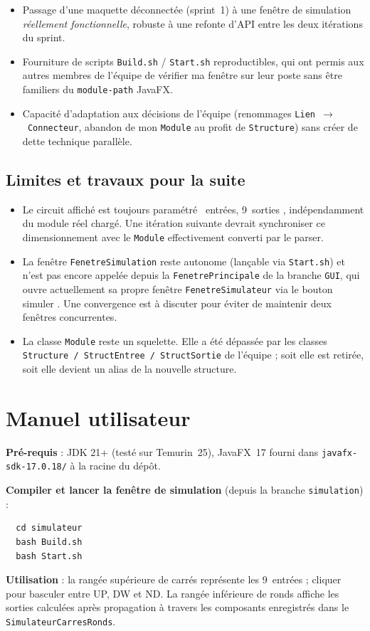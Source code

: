 \documentclass[11pt,a4paper]{article}
\begin{document}
\begin{itemize}
  \item Passage d'une maquette d\'econnect\'ee (sprint~1) \`a une fen\^etre de simulation \emph{r\'eelle\-ment fonctionnelle}, robuste \`a une refonte d'API entre les deux it\'erations du sprint.
  \item Fourniture de scripts \texttt{Build.sh} / \texttt{Start.sh} reproductibles, qui ont permis aux autres membres de l'\'equipe de v\'erifier ma fen\^etre sur leur poste sans \^etre familiers du \texttt{module-path} JavaFX.
  \item Capacit\'e d'adaptation aux d\'ecisions de l'\'equipe (renommages \texttt{Lien~$\to$~Connecteur}, abandon de mon \texttt{Module} au profit de \texttt{Structure}) sans cr\'eer de dette technique parall\`ele.
\end{itemize}

\subsection*{Limites et travaux pour la suite}

\begin{itemize}
  \item Le circuit affich\'e est toujours param\'etr\'e ~entr\'ees, 9~sorties \fg{}, ind\'ependamment du module r\'eel charg\'e. Une it\'eration suivante devrait synchroniser ce dimensionnement avec le \texttt{Module} effectivement converti par le parser.
  \item La fen\^etre \texttt{FenetreSimulation} reste autonome (lan\c{c}able via \texttt{Start.sh}) et n'est pas encore appel\'ee depuis la \texttt{FenetrePrincipale} de la branche \texttt{GUI}, qui ouvre actuellement sa propre fen\^etre \texttt{FenetreSimulateur} via le bouton \og simuler \fg{}. Une convergence est \`a discuter pour \'eviter de maintenir deux fen\^etres concurrentes.
  \item La classe \texttt{Module} reste un squelette. Elle a \'et\'e d\'epass\'ee par les classes \texttt{Structure~/ StructEntree~/ StructSortie} de l'\'equipe ; soit elle est retir\'ee, soit elle devient un alias de la nouvelle structure.
\end{itemize}

\section*{Manuel utilisateur}

\textbf{Pr\'e-requis} : JDK 21+ (testé sur Temurin~25), JavaFX~17 fourni dans \texttt{javafx-sdk-17.0.18/} \`a la racine du d\'ep\^ot.

\textbf{Compiler et lancer la fen\^etre de simulation} (depuis la branche \texttt{simulation}) :
\begin{verbatim}
  cd simulateur
  bash Build.sh
  bash Start.sh
\end{verbatim}

\textbf{Utilisation} : la rang\'ee sup\'erieure de carr\'es repr\'esente les 9~entr\'ees ; cliquer pour basculer entre UP, DW et ND. La rang\'ee inf\'erieure de ronds affiche les sorties calcul\'ees apr\`es propagation \`a travers les composants enregistr\'es dans le \texttt{SimulateurCarresRonds}.
\end{document}

